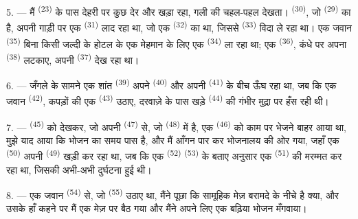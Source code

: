 5. --- मैं  \textsuperscript{(23)} के पास देहरी पर कुछ देर
और खड़ा रहा, गली की चहल-पहल देखता।  \textsuperscript{(30)}, जो
 \textsuperscript{(29)} का है, अपनी गाड़ी पर एक
 \textsuperscript{(31)} लाद रहा था, जो एक 
\textsuperscript{(32)} का था, जिससे
 \textsuperscript{(33)} विदा ले रहा था। एक जवान
 \textsuperscript{(35)} बिना किसी जल्दी के होटल के एक
मेहमान के लिए एक  \textsuperscript{(34)} ला रहा था; एक
 \textsuperscript{(36)}, कंधे पर अपना 
\textsuperscript{(38)} लटकाए, अपनी  \textsuperscript{(37)} देख
रहा था।

\VUsaut{4.0mm}
\VUsaut{3.0mm}

6. --- जँगले के सामने एक शांत  \textsuperscript{(39)} अपने
 \textsuperscript{(40)} और अपनी 
\textsuperscript{(41)} के बीच ऊँघ रहा था, जब कि एक जवान  \textsuperscript{(42)},
कपड़ों की एक  \textsuperscript{(43)} उठाए, दरवाज़े के
पास खड़े  \textsuperscript{(44)} की गंभीर मुद्रा पर हँस रही
थी।

7. ---  \textsuperscript{(45)} को देखकर, जो अपनी 
\textsuperscript{(47)} से, जो  \textsuperscript{(48)} में है, एक
 \textsuperscript{(46)} को काम पर भेजने बाहर आया था, मुझे
याद आया कि भोजन का समय पास है, और मैं आँगन पार कर भोजनालय की ओर गया, जहाँ एक
 \textsuperscript{(50)} अपनी  \textsuperscript{(49)}
खड़ी कर रहा था, जब कि एक  \textsuperscript{(52)}
 \textsuperscript{(53)} के बताए अनुसार एक
 \textsuperscript{(51)} की मरम्मत कर रहा था, जिसकी अभी-अभी
दुर्घटना हुई थी।

8. --- एक जवान  \textsuperscript{(54)} से, जो
 \textsuperscript{(55)} उठाए था, मैंने पूछा कि सामूहिक मेज़ बरामदे के
नीचे है क्या, और उसके हाँ कहने पर मैं एक मेज़ पर बैठ गया और मैंने अपने लिए एक
बढ़िया भोजन मँगवाया।


\VUsaut{4.0mm}
\VUsaut{3.0mm}


